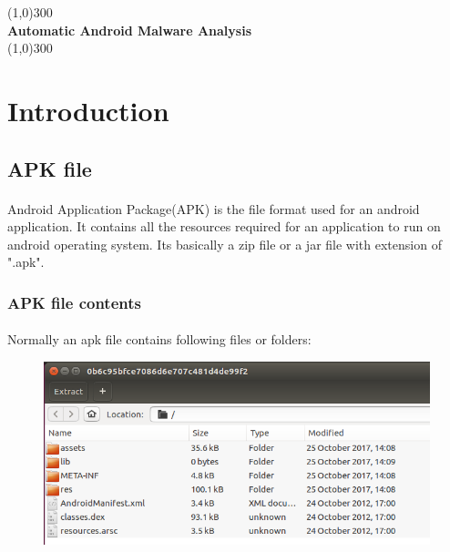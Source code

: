 \documentclass{article}
\begin{document}
	\begin{titlepage}
		\begin{center}
			\line(1,0){300}\\
			\huge{\bfseries Automatic Android Malware Analysis}\\
			\line(1,0){300}\\
		\end{center}
	\end{titlepage}
	
	\tableofcontents
	\cleardoublepage
	
	\section{Introduction}\label{sec:intro}
		\subsection{APK file}\label{sec:apk}	
				\paragraph{} Android Application Package(APK) is the file format used for an android application. It contains all the resources required for an application to run on android operating system. Its basically a zip file or a jar file with extension of ".apk"\cite{APK_structure}.
			\subsubsection{APK file contents}
				\paragraph{} Normally an apk file contains following files or folders:
				
				\begin{figure}[h]
					\includegraphics[width=\textwidth]{apk_contents.png}
				\end{figure}
\end{document}

